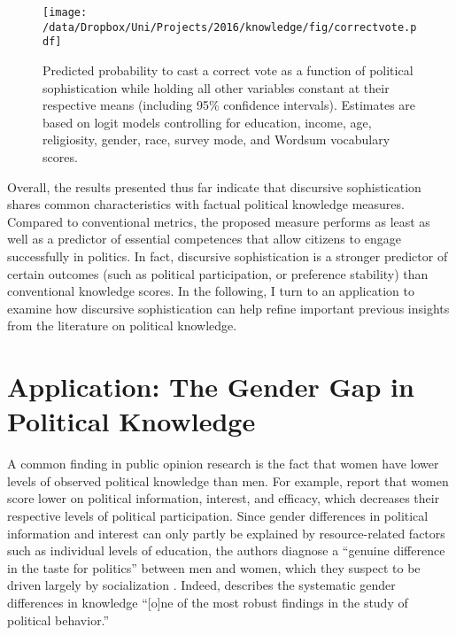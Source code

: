 \begin{figure}[h]\centering
\texttt{[image: /data/Dropbox/Uni/Projects/2016/knowledge/fig/correctvote.pdf]}
\caption{Predicted probability to cast a correct vote as a function of political sophistication while holding all other variables constant at their respective means (including 95\% confidence intervals). Estimates are based on logit models controlling for education, income, age, religiosity, gender, race, survey mode, and Wordsum vocabulary scores.}\label{fig:correctvote}
\end{figure}


Overall, the results presented thus far indicate that discursive sophistication shares common characteristics with factual political knowledge measures. Compared to conventional metrics, the proposed measure performs as least as well as a predictor of essential competences that allow citizens to engage successfully in politics. In fact, discursive sophistication is a stronger predictor of certain outcomes (such as political participation, or preference stability) than conventional knowledge scores. In the following, I turn to an application to examine how discursive sophistication can help refine important previous insights from the literature on political knowledge.


\section*{Application: The Gender Gap in Political Knowledge}

A common finding in public opinion research is the fact that women have lower levels of observed political knowledge than men. For example, \citet{verba1997knowing} report that women score lower on political information, interest, and efficacy, which decreases their respective levels of political participation. Since gender differences in political information and interest can only partly be explained by resource-related factors such as individual levels of education, the authors diagnose a ``genuine difference in the taste for politics'' between men and women, which they suspect to be driven largely by socialization \citep[see also][]{wolak2011roots}. Indeed, \citet[117]{dow2009gender} describes the systematic gender differences in knowledge ``[o]ne of the most robust findings in the study of political behavior.''

